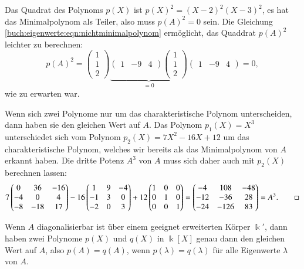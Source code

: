 \begin{beispiel}
Das Quadrat des Polynoms $p(X)$ ist $p(X)^2 = (X-2)^2(X-3)^2$, es hat
das Minimalpolynom als Teiler, also muss $p(A)^2=0$ sein.
Die Gleichung \eqref{buch:eigenwerte:eqn:nichtminimalpolynom} ermöglicht,
das Quaddrat $p(A)^2$ leichter zu berechnen:
\[
p(A)^2
=
\begin{pmatrix}1\\1\\2\end{pmatrix}
\underbrace{
\begin{pmatrix}1&-9&4\end{pmatrix}
\begin{pmatrix}1\\1\\2\end{pmatrix}
}_{\displaystyle = 0}
\begin{pmatrix}1&-9&4\end{pmatrix}
=
0
,
\]
wie zu erwarten war.

Wenn sich zwei Polynome nur um das charakteristische Polynom unterscheiden,
dann haben sie den gleichen Wert auf $A$.
Das Polynom $p_1(X)=X^3$ unterschiedet sich vom Polynom $p_2(X)=7X^2-16X+12$ 
um das charakteristische Polynom, welches wir bereits als das Minimalpolynom
von $A$ erkannt haben.
Die dritte Potenz $A^3$ von $A$ muss sich daher auch mit $p_2(X)$ berechnen
lassen:
\[
7
\begin{pmatrix}
  0&  36& -16 \\
 -4&   0&   4 \\
 -8& -18&  17 
\end{pmatrix}
-16
\begin{pmatrix}
   1&  9& -4\\
  -1&  3&  0\\
  -2&  0&  3
\end{pmatrix}
+12
\begin{pmatrix}
1&0&0\\
0&1&0\\
0&0&1
\end{pmatrix}
=
\begin{pmatrix}
 -4& 108&  -48\\
-12& -36&   28\\
-24&-126&   83
\end{pmatrix}
=
A^3.
\qedhere
\]
\end{beispiel}

\begin{satz}
Wenn $A$ diagonalisierbar ist über einem geeignet erweiterten Körper $\Bbbk'$,
dann haben zwei Polynome $p(X)$ und $q(X)$ in $\Bbbk[X]$ genau dann
den gleichen Wert auf $A$, also $p(A)=q(A)$, wenn $p(\lambda) = q(\lambda)$
für alle Eigenwerte $\lambda$ von $A$.
\end{satz}

